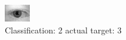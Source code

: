 \begin{figure}[h!]
\begin{center}
\includegraphics[width=0.60\columnwidth]{figures/ID603_class_2_target_3.png}
\end{center}
\caption{ Classification: 2 actual target: 3}
\label{fig:ID603_class_2_target_3}
\end{figure}
